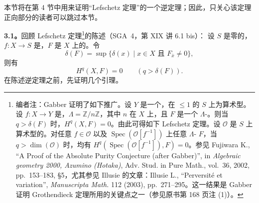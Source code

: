 本节将在第 4 节中用来证明“Lefschetz 定理”的一个逆定理；因此，只关心该定理正向部分的读者可以跳过本节。

\textbf{3.1。}回顾 Lefschetz 定理\footnote{编者注：Gabber 证明了如下推广。设 $Y$ 是一个，在 $\leq1$ 的 $S$ 上为算术型。设 $f:X\to Y$ 是，$\Lambda=\mathbb Z/n\mathbb Z$，其中 $n$ 在 $X$ 上，且 $F$ 是一个 $\Lambda$-。则当 $q>\delta(F)$ 时，$H^q(X,F)=0$。由此可得如下 Lefschetz 定理。设 $\mathscr O$ 是 $S$ 上算术型的。对任意 $f\in\mathscr O$ 以及 $\operatorname{Spec}(\mathscr O[f^{-1}])$ 上任意 $\Lambda$- $F$，当 $q>\dim(\mathscr O)$ 时，均有 $H^q(\operatorname{Spec}(\mathscr O[f^{-1}]),F)=0$。参见 Fujiwara K., ``A Proof of the Absolute Purity Conjecture (after Gabber)'', in \emph{Algebraic geometry 2000, Azumino (Hotaka)}, Adv. Stud. in Pure Math., vol.~36, 2002, pp.~153--183, \S5，尤其参见 Illusie 的文章：Illusie L., ``Perversité et variation'', \emph{Manuscripta Math.} 112 (2003), pp.~271--295。这一结果是 Gabber 证明 Grothendieck 定理所用的关键点之一（参见原书第 168 页注 (1)）。}的陈述（SGA~4，第 XIX 讲 6.1 bis）：
设 $S$ 是零的，$f:X\to S$ 是，$F$ 是 $X$ 上的。令
\[
\delta(F)=\sup\{\delta(x)\mid x\in X\text{ 且 }F_{\bar x}\ne0\},
\]
则有
\[
H^q(X,F)=0\qquad(q>\delta(F)).
\]
在陈述逆定理之前，先证明几个引理。

